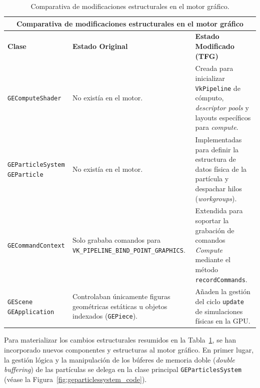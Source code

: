 \begin{table}[h!]
\centering
\begin{tabular}{|p{3.5cm}|p{6cm}|p{6cm}|}
\hline
\multicolumn{3}{|c|}{\textbf{Comparativa de modificaciones estructurales en el motor gráfico}} \\ \hline
\textbf{Clase} & \textbf{Estado Original} & \textbf{Estado Modificado (TFG)} \\ \hline
\texttt{GEComputeShader} & No existía en el motor. & Creada para inicializar \texttt{VkPipeline} de cómputo, \textit{descriptor pools} y layouts específicos para \textit{compute}. \\ \hline
\texttt{GEParticleSystem} \newline \texttt{GEParticle} & No existía en el motor. & Implementadas para definir la estructura de datos física de la partícula y despachar hilos (\textit{workgroups}). \\ \hline
\texttt{GECommandContext} & Solo grababa comandos para \texttt{VK\_PIPELINE\_BIND\_POINT\_GRAPHICS}. & Extendida para soportar la grabación de comandos \textit{Compute} mediante el método \texttt{recordCommands}. \\ \hline
\texttt{GEScene} \newline \texttt{GEApplication} & Controlaban únicamente figuras geométricas estáticas u objetos indexados (\texttt{GEPiece}). & Añaden la gestión del ciclo \texttt{update} de simulaciones físicas en la GPU. \\ \hline
\end{tabular}
\caption{Comparativa de modificaciones estructurales en el motor gráfico.}
\label{tab:modificaciones}
\end{table}

Para materializar los cambios estructurales resumidos en la Tabla~\ref{tab:modificaciones}, se han incorporado nuevos componentes y estructuras al motor gráfico. En primer lugar, la gestión lógica y la manipulación de los búferes de memoria doble (\textit{double buffering}) de las partículas se delega en la clase principal \texttt{GEParticlesSystem} (véase la Figura~\ref{fig:geparticlessystem_code}).

